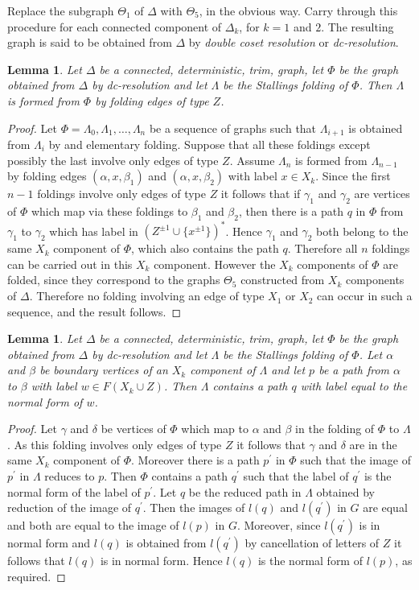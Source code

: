 \documentclass[a4paper,12pt]{article}
\renewcommand{\a}{\alpha }
\renewcommand{\b}{\beta }
\newcommand{\g}{\gamma }
\newcommand{\D}{\Delta }
\renewcommand{\d}{\delta }
\newcommand{\T}{\Theta }
\renewcommand{\L}{\Lambda }
\newtheorem{lemma}[theorem]{Lemma}
\numberwithin{equation}{section}
\numberwithin{figure}{section}
\begin{document}
Replace the subgraph $\T_1$ of $\D$ with $\T_5$, in the obvious
way. Carry through this procedure for each connected component of
$\D_k$, for $k=1$ and $2$. The resulting graph is said to be
obtained from $\D$ by {\em double coset resolution} or {\em dc-resolution}.


\begin{lemma}
Let $\D$ be  a connected, deterministic, trim, graph, let $\Phi$ be
the graph
obtained from $\D$ by dc-resolution %
and let
$\L$ be the Stallings folding of $\Phi$. Then $\L$ is formed from
$\Phi$ by folding edges of type $Z$.
\end{lemma}
\begin{proof}
Let $\Phi=\L_0,\L_1,\ldots, \L_n$ be a sequence of graphs such that
$\L_{i+1}$ is obtained from $\L_i$ by and elementary folding.
Suppose that all these foldings except possibly the last involve only edges
of type $Z$. Assume $\L_n$ is formed from $\L_{n-1}$ by folding edges
$(\a,x,\b_1)$ and $(\a,x,\b_2)$ with label $x\in X_k$. Since the
first $n-1$ foldings involve only edges of type $Z$ it follows that
if $\g_1$ and $\g_2$ are vertices of $\Phi$ which map via these foldings
to $\b_1$ and $\b_2$, then there is a path $q$ in $\Phi$ from $\g_1$ to $\g_2$
which has label in $(Z^{\pm 1}\cup \{x^{\pm 1}\})^\ast$. Hence $\g_1$ and $\g_2$ both belong to
 the same $X_k$ component of $\Phi$, which also contains the path $q$.
Therefore all $n$ foldings can be carried out in this $X_k$
component. However the $X_k$ components of $\Phi$ are folded, since they
correspond to the graphs $\T_5$ constructed from $X_k$ components of $\D$.
Therefore no folding involving an edge of type $X_1$ or $X_2$ can occur
in such a sequence, and the result follows.
\end{proof}
\begin{lemma}
Let $\D$ be  a connected, deterministic, trim, graph, let $\Phi$ be
the graph
obtained from $\D$ by dc-resolution %
and let
$\L$ be the Stallings folding of $\Phi$. Let $\a$  and $\b$ be boundary
vertices of an $X_k$ component of $\L$ and let $p$ be a path from
$\a$ to $\b$ with label $w\in F(X_k\cup Z)$. Then $\L$ contains a
path $q$ with label equal to the normal form of $w$.
\end{lemma}
\begin{proof}
Let $\g$ and $\d$ be vertices of $\Phi$ which map to $\a$ and $\b$ in the
folding of $\Phi$ to $\L$. As this folding involves only edges of type $Z$
it follows that $\g$ and $\d$ are in the same $X_k$ component of $\Phi$.
Moreover there is a path $p^\prime$ in $\Phi$ such that the image
of $p^\prime$ in $\L$ reduces to $p$. Then $\Phi$ contains a path
$q^\prime$ such that the label of $q^\prime$ is the normal form of
the label of $p^\prime$. Let $q$ be the reduced path in $\L$ obtained by
reduction of the image of $q^\prime$. Then the images of $l(q)$ and
$l(q^\prime)$ in $G$ are equal and both are equal to the image of $l(p)$ in
$G$. Moreover, since $l(q^\prime)$ is in normal form and $l(q)$ is obtained
from $l(q^\prime)$ by cancellation of letters of $Z$ it follows that
$l(q)$ is in normal form. Hence $l(q)$ is the normal form of $l(p)$,
as required.
\end{proof}
\end{document}
